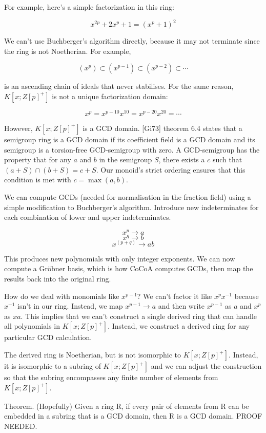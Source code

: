 \documentclass{article}
\begin{document}
For example, here's a simple factorization in this ring:

$$x^{2p}+2x^p+1=(x^p+1)^2$$

We can't use Buchberger's algorithm directly, because it may not terminate since
the ring is not Noetherian.  For example,

$$(x^p) \subset (x^{p-1}) \subset (x^{p-2}) \subset \cdots$$

is an ascending chain of ideals that never stabilises.
For the same reason, $K[x; Z[p]^+]$ is not a unique factorization domain:

$$x^p = x^{p-10}x^{10} = x^{p-20}x^{20} = \cdots$$

However, $K[x; Z[p]^+]$ is a GCD domain.  [Gi73] theorem 6.4 states that a semigroup
ring is a GCD domain if its coefficient field is a GCD domain and its semigroup
is a torsion-free GCD-semigroup with zero.  A GCD-semigroup has the property
that for any $a$ and $b$ in the semigroup $S$, there exists a $c$ such that
$(a + S) \cap (b + S) = c + S$.  Our monoid's strict ordering ensures that
this condition is met with $c = \max(a,b)$.

We can compute GCDs (needed for normalisation in the fraction field) using a
simple modification to Buchberger's algorithm.  Introduce new indeterminates
for each combination of lower and upper indeterminates.

$$x^p  \to  a$$
$$x^q  \to  b$$
$$x^{(p+q)} \to ab$$

This produces new polynomials with only integer exponents.  We can now
compute a Gr\"obner basis, which is how CoCoA computes GCDs, then map
the results back into the original ring.

How do we deal with monomials like $x^{p-1}$?  We can't factor it like
$x^px^{-1}$ because $x^{-1}$ isn't in our ring.  Instead, we map
$x^{p-1} \to a$ and then write $x^{p-1}$ as $a$ and $x^p$ as $xa$.
This implies that we can't construct a single derived ring that can
handle all polynomials in $K[x; Z[p]^+]$.  Instead, we construct a
derived ring for any particular GCD calculation.

The derived ring is Noetherian, but is not isomorphic to $K[x; Z[p]^+]$.
Instead, it is isomorphic to a subring of $K[x; Z[p]^+]$ and we can adjust
the construction so that the subring encompasses any finite number of
elements from $K[x; Z[p]^+]$.

Theorem.  (Hopefully) Given a ring R, if every pair of elements from R can be
embedded in a subring that is a GCD domain, then R is a GCD domain.
PROOF NEEDED.
\end{document}
